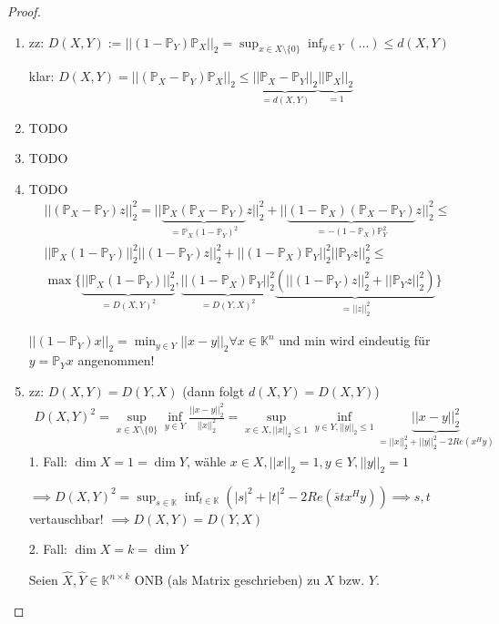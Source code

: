 \begin{proof}
	\begin{enumerate}
		\item zz: $D(X,Y) := ||(1-\mathbb{P}_Y)\mathbb{P}_X||_2 = \sup_{x\in X\setminus\{0\}} \inf_{y\in Y} (...) \leq d(X,Y)$
		
		klar: $D(X,Y) = ||(\mathbb{P}_X - \mathbb{P}_Y)\mathbb{P}_X||_2 \leq \underbrace{||\mathbb{P}_X - \mathbb{P}_Y||_2}_{=d(X,Y)} \underbrace{||\mathbb{P}_X||_2}_{=1}$
		
		\item TODO
		\item TODO
		\item TODO
		\begin{align*}
			||(\mathbb{P}_X - \mathbb{P}_Y)z||_2^2 = ||\underbrace{\mathbb{P}_X(\mathbb{P}_X - \mathbb{P}_Y)}_{= \mathbb{P}_X(1-\mathbb{P}_Y)^2}z||_2^2 + ||\underbrace{(1-\mathbb{P}_X)(\mathbb{P}_X - \mathbb{P}_Y)}_{=-(1-\mathbb{P}_X)\mathbb{P}_Y^2}z||_2^2 \leq\\
			||\mathbb{P}_X(1-\mathbb{P}_Y)||_2^2 ||(1-\mathbb{P}_Y)z||_2^2 + ||(1-\mathbb{P}_X)\mathbb{P}_Y||_2^2 ||\mathbb{P}_Yz||_2^2 \leq\\
			\max\{\underbrace{||\mathbb{P}_X(1-\mathbb{P}_Y)||_2^2}_{=D(X,Y)^2}, \underbrace{||(1-\mathbb{P}_X)\mathbb{P}_Y||_2^2}_{=D(Y,X)^2}\underbrace{(||(1-\mathbb{P}_Y)z||_2^2 + ||\mathbb{P}_Yz||_2^2)}_{=||z||_2^2}\}
		\end{align*}
		
		$||(1-\mathbb{P}_Y)x||_2 = \min_{y \in Y}||x-y||_2 \forall x \in \mathbb{K}^n$ und min wird eindeutig für $y = \mathbb{P}_Yx$ angenommen!
		
		\item zz: $D(X,Y) = D(Y,X)$ (dann folgt $d(X,Y) = D(X,Y)$)
		\begin{align*}
			D(X,Y)^2 = \sup_{x \in X\setminus\{0\}} \inf_{y\in Y} \frac{||x-y||_2^2}{||x||_2^2} =
			\sup_{x\in X, ||x||_2\leq1} \inf_{y\in Y, ||y||_2 \leq 1} \underbrace{||x-y||_2^2}_{= ||x||_2^2  + ||y||_2^2 - 2Re(x^Hy)}
		\end{align*}
		1. Fall: $\dim X = 1 = \dim Y$, wähle $x \in X, ||x||_2 = 1, y \in Y, ||y||_2 = 1$
		
		$\implies D(X,Y)^2 = \sup_{s \in \mathbb{K}} \inf_{t\in \mathbb{K}} (|s|^2 + |t|^2 - 2Re(\bar{s}tx^Hy)) \implies s,t$ vertauschbar! $\implies D(X,Y) = D(Y,X)$
		
		2. Fall: $\dim X = k = \dim Y$
		
		Seien $\hat{X}, \hat{Y} \in \mathbb{K}^{n\times k}$ ONB (als Matrix geschrieben) zu $X$ bzw. $Y$.
		

\end{enumerate}
\end{proof}
